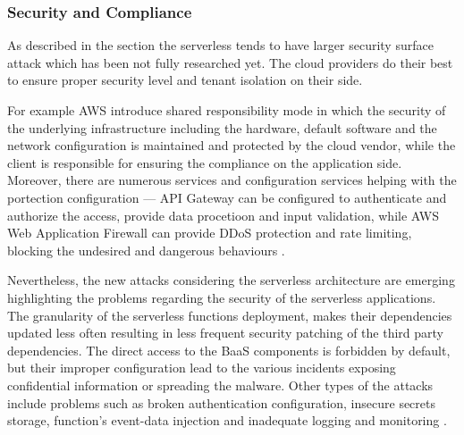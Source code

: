 

\subsubsection{Security and Compliance}

As described in the section \label{chapter:serverless-security-concerns} the serverless tends to have larger security surface attack which has been not fully researched yet. 
The cloud providers do their best to ensure proper security level and tenant isolation on their side. 

For example AWS introduce shared responsibility mode in which the security of the underlying infrastructure including the hardware, default software and the network configuration is maintained and protected by the cloud vendor, while the client is responsible for ensuring the compliance on the application side.
Moreover, there are numerous services and configuration services helping with the portection configuration --- API Gateway can be configured to authenticate and authorize the access, provide data procetioon and input validation, while AWS Web Application Firewall can provide DDoS protection and rate limiting, blocking the undesired and dangerous behaviours \cite{EvaluationOfServerlessApplicationProgrammingModel}.

Nevertheless, the new attacks considering the serverless architecture are emerging highlighting the problems regarding the security of the serverless applications. The granularity of the serverless functions deployment, makes their dependencies updated less often resulting in less frequent security patching of the third party dependencies. 
The direct access to the BaaS components is forbidden by default, but their improper configuration lead to the various incidents exposing confidential information or spreading the malware.
Other types of the attacks include problems such as broken authentication configuration, insecure secrets storage, function's event-data injection and inadequate logging and monitoring \cite{EvaluationOfServerlessApplicationProgrammingModel}.

